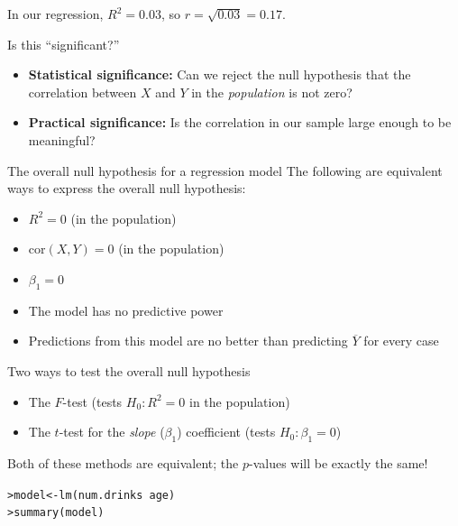 \documentclass{beamer}\usepackage[]{graphicx}\usepackage[]{color}
\makeatletter
\newcommand{\hlopt}[1]{\textcolor[rgb]{1,0.894,0.769}{#1}}%
\newcommand{\hlstd}[1]{\textcolor[rgb]{1,0.894,0.769}{#1}}%
\newcommand{\hlkwb}[1]{\textcolor[rgb]{0.804,0.776,0.451}{#1}}%
\newcommand{\hlkwd}[1]{\textcolor[rgb]{1,0.78,0.769}{#1}}%
\newenvironment{kframe}{%
 \def\at@end@of@kframe{}%
 \ifinner\ifhmode%
  \def\at@end@of@kframe{\end{minipage}}%
  \begin{minipage}{\columnwidth}%
 \fi\fi%
 \def\FrameCommand##1{\hskip\@totalleftmargin \hskip-\fboxsep
 \colorbox{shadecolor}{##1}\hskip-\fboxsep
     \hskip-\linewidth \hskip-\@totalleftmargin \hskip\columnwidth}%
 \MakeFramed {\advance\hsize-\width
   \@totalleftmargin\z@ \linewidth\hsize
   \@setminipage}}%
 {\par\unskip\endMakeFramed%
 \at@end@of@kframe}
\newenvironment{knitrout}{}{} %
\makeatother
\begin{document}
\begin{darkframes}
    \begin{frame}
      In our regression, $R^2=0.03$, so $r=\sqrt{0.03}=0.17$.  

      Is this ``significant?''
      \pause
      \begin{itemize}[<+->]
        \item \textbf{Statistical significance:} Can we reject the null hypothesis that the correlation between $X$ and $Y$ in the \emph{population} is not zero?
        \item \textbf{Practical significance:} Is the correlation in our sample large enough to be meaningful?
      \end{itemize}
    \end{frame}

    \begin{frame}{The overall null hypothesis for a regression model}
      The following are equivalent ways to express the overall null hypothesis:
      \begin{itemize}[<+->]
        \item $R^2=0$ (in the population)
        \item $\text{cor}(X,Y)=0$ (in the population)
        \item $\beta_1=0$
        \item The model has no predictive power
        \item Predictions from this model are no better than predicting $\overline Y$ for every case
      \end{itemize}
    \end{frame}

    \begin{frame}{Two ways to test the overall null hypothesis}
      \begin{itemize}
        \item The $F$-test (tests $H_0:R^2=0$ in the population)
        \item The $t$-test for the \emph{slope} ($\beta_1$) coefficient (tests $H_0:\beta_1=0$)
      \end{itemize}
      \pause
      Both of these methods are equivalent; the $p$-values will be exactly the same!
    \end{frame}

    \begin{frame}[fragile]
      \fontsize{9}{9}\selectfont
\begin{knitrout}
\begin{kframe}
\begin{alltt}
\hlstd{> }\hlstd{model} \hlkwb{<-} \hlkwd{lm}\hlstd{(num.drinks} \hlopt{~} \hlstd{age)}
\hlstd{> }\hlkwd{summary}\hlstd{(model)}
\end{alltt}
\begin{verbatim}


\end{verbatim}
\end{kframe}
\end{knitrout}
\end{frame}
\end{darkframes}
\end{document}
